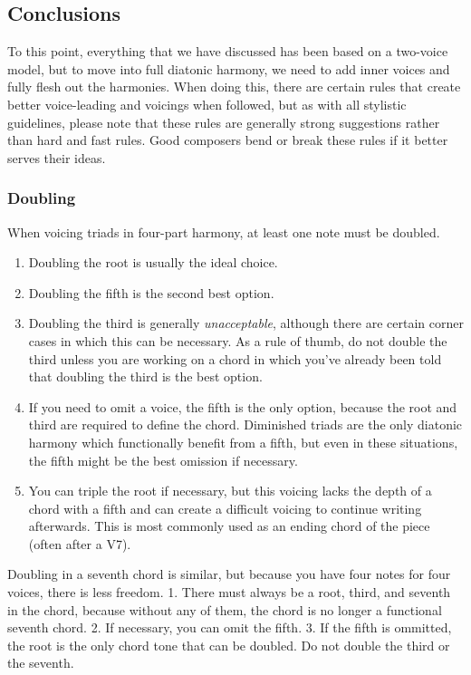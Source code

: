 \documentclass{book}
\providecommand{\tightlist}{%
  \setlength{\itemsep}{0pt}\setlength{\parskip}{0pt}}
\begin{document}
\hypertarget{conclusions-25}{%
\subsection{Conclusions}\label{conclusions-25}}

To this point, everything that we have discussed has been based on a two-voice
model, but to move into full diatonic harmony, we need to add inner voices and
fully flesh out the harmonies. When doing this, there are certain rules that
create better voice-leading and voicings when followed, but as with all
stylistic guidelines, please note that these rules are generally strong
suggestions rather than hard and fast rules. Good composers bend or break
these rules if it better serves their ideas.

\hypertarget{doubling}{%
\subsubsection{Doubling}\label{doubling}}

When voicing triads in four-part harmony, at least one note must be doubled.

\begin{enumerate}
\def\labelenumi{\arabic{enumi}.}
\tightlist
\item
  Doubling the root is usually the ideal choice.
\item
  Doubling the fifth is the second best option.
\item
  Doubling the third is generally \emph{unacceptable}, although there are
  certain corner cases in which this can be necessary. As a rule of thumb, do
  not double the third unless you are working on a chord in which you've
  already been told that doubling the third is the best option.
\item
  If you need to omit a voice, the fifth is the only option, because the root
  and third are required to define the chord. Diminished triads are the only
  diatonic harmony which functionally benefit from a fifth, but even in these
  situations, the fifth might be the best omission if necessary.
\item
  You can triple the root if necessary, but this voicing lacks the depth of a
  chord with a fifth and can create a difficult voicing to continue writing
  afterwards. This is most commonly used as an ending chord of the piece
  (often after a V7).
\end{enumerate}

Doubling in a seventh chord is similar, but because you have four notes for
four voices, there is less freedom. 1. There must always be a root, third, and
seventh in the chord, because without any of them, the chord is no longer a
functional seventh chord. 2. If necessary, you can omit the fifth. 3. If the
fifth is ommitted, the root is the only chord tone that can be doubled. Do not
double the third or the seventh.
\end{document}
